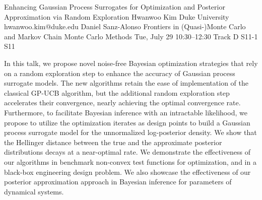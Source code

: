 \begin{talk}
  {Enhancing Gaussian Process Surrogates for Optimization and Posterior Approximation via Random Exploration}%
  {Hwanwoo Kim}%
  {Duke University}%
  {hwanwoo.kim@duke.edu}%
  {Daniel Sanz-Alonso}%
  {Frontiers in (Quasi-)Monte Carlo and Markov Chain Monte Carlo Methods}%
  {Tue, July 29 10:30–12:30 Track D}%
  {S11-1}%
  {S11}%
				
			
In this talk, we propose novel noise-free Bayesian optimization strategies that rely on a random exploration step to enhance the accuracy of Gaussian process surrogate models. The new algorithms retain the ease of implementation of the classical GP-UCB algorithm, but the additional random exploration step accelerates their convergence, nearly achieving the optimal convergence rate. Furthermore, to facilitate Bayesian inference with an intractable likelihood, we propose to utilize the optimization iterates as design points to build a Gaussian process surrogate model for the unnormalized log-posterior density. We show that the Hellinger distance between the true and the approximate posterior distributions decays at a near-optimal rate. We demonstrate the effectiveness of our algorithms in benchmark non-convex test functions for optimization, and in a black-box engineering design problem. We also showcase the effectiveness of our posterior approximation approach in Bayesian inference for parameters of dynamical systems.


\end{talk}

